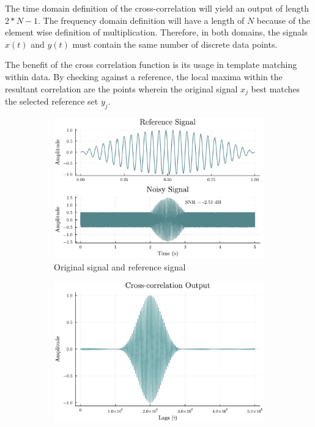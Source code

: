             The time domain definition of the cross-correlation will yield an output of length $2*N - 1$. The frequency domain definition will have a length of $N$ because of the element wise definition of multiplication. Therefore, in both domains, the signals $x(t)$ and $y(t)$ must contain the same number of discrete data points.

            The benefit of the cross correlation function is its usage in template matching within data. By checking against a reference, the local maxima within the resultant correlation are the points wherein the original signal $x_j$ best matches the selected reference set $y_j$.

            \begin{figure} [h]
                \centering
                \begin{subfigure}[b]{0.45\textwidth}
                    \centering
                    \includegraphics[width=\textwidth]{images/Background/Cross Correlation Reference and Data.pdf}
                    \caption{Original signal and reference signal}
                    \label{fig: original and ref}
                \end{subfigure}
                \hfill
                \begin{subfigure}[b]{0.45\textwidth}
                    \centering
                    \includegraphics[width=\textwidth]{images/Background/Cross Correlation Output.pdf}

\end{subfigure}
\end{figure}
